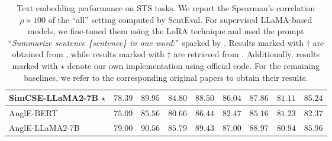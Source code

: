 \documentclass{article} \usepackage{iclr2024_conference,times}
\begin{document}
\begin{table*}[ht]
\begin{threeparttable}
\begin{tabular}{lcccccccc}
SimCSE-LLaMA2-7B $\star$ & $78.39$ & $89.95$ & $84.80$ & $88.50$ & $86.04$ & $87.86$ & $81.11$ & $85.24$ \\ 

\midrule
AnglE-BERT & $75.09$ & $85.56$ & $80.66$ & $86.44$ & $82.47$ & $85.16$ & $81.23$ & $82.37$ \\



AnglE-LLaMA2-7B & $\mathbf{79.00}$ & $\mathbf{90.56}$ & $\mathbf{85.79}$ & $\mathbf{89.43}$ & $\mathbf{87.00}$ & $\mathbf{88.97}$ & $\mathbf{80.94}$ & $\mathbf{85.96}$ \\ 







\bottomrule
\end{tabular}
\end{threeparttable}
\caption{Text embedding performance on STS tasks. We report the Spearman's correlation $\rho \times 100$ of the ``all'' setting computed by SentEval. For supervised LLaMA-based models, we fine-tuned them using the LoRA \citep{hu2021lora} technique and used the prompt ``\textit{Summarize sentence \{sentence\} in one word:}'' sparked by \citep{jiang2023scaling}. Results marked with $\dagger$ are obtained from \citep{sbert-nils-2019}, while results marked with $\ddagger$ are retrieved from \citep{simcse_gao_2021}. Additionally, results marked with $\star$ denote our own implementation using official code. For the remaining baselines, we refer to the corresponding original papers to obtain their results. 
}
\label{table-main-sts-results}
\end{table*}
\end{document}
